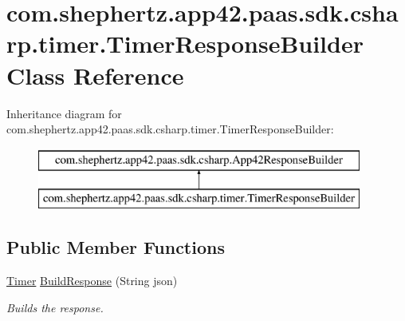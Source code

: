 \hypertarget{classcom_1_1shephertz_1_1app42_1_1paas_1_1sdk_1_1csharp_1_1timer_1_1_timer_response_builder}{\section{com.\+shephertz.\+app42.\+paas.\+sdk.\+csharp.\+timer.\+Timer\+Response\+Builder Class Reference}
\label{classcom_1_1shephertz_1_1app42_1_1paas_1_1sdk_1_1csharp_1_1timer_1_1_timer_response_builder}
}
Inheritance diagram for com.\+shephertz.\+app42.\+paas.\+sdk.\+csharp.\+timer.\+Timer\+Response\+Builder\+:\begin{figure}[H]
\begin{center}
\leavevmode
\includegraphics[height=2.000000cm]{classcom_1_1shephertz_1_1app42_1_1paas_1_1sdk_1_1csharp_1_1timer_1_1_timer_response_builder}
\end{center}
\end{figure}
\subsection*{Public Member Functions}
\begin{DoxyCompactItemize}
\item 
\hyperlink{classcom_1_1shephertz_1_1app42_1_1paas_1_1sdk_1_1csharp_1_1timer_1_1_timer}{Timer} \hyperlink{classcom_1_1shephertz_1_1app42_1_1paas_1_1sdk_1_1csharp_1_1timer_1_1_timer_response_builder_a1d37be787dca5690ec1801dd3924b857}{Build\+Response} (String json)
\begin{DoxyCompactList}\small\item\em Builds the response. \end{DoxyCompactList}\end{DoxyCompactItemize}



